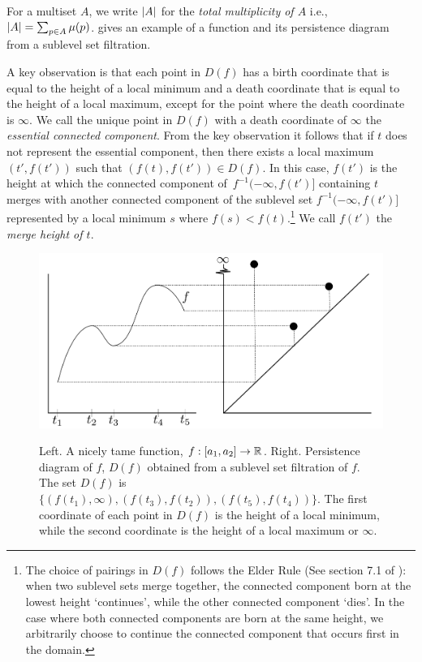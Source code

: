 For a multiset $A$, we write $\left|A\right|$
for the \emph{total multiplicity of $A$} i.e., $\left|A\right| = \sum_{p \in
A} \mu(p)$.  gives an example of a function and its persistence
diagram from a sublevel set filtration.

A key observation is that each point in $D(f)$ has a birth
coordinate that is equal to the height of a local minimum and a death coordinate
that is equal to the height of a local maximum, except for the point where the
death coordinate is $\infty$. 
We call the unique point in $D(f)$ with a death coordinate of $\infty$
the \emph{essential connected component}. From the key observation it follows that  if
$t$ does not represent the essential component, then there exists a local
maximum $(t', f(t'))$ such that $(f(t),f(t')) \in D(f)$.
In this case, $f(t')$ is the height at which the connected
component of~$f^{-1}(-\infty, f(t')]$ containing $t$ merges with another
connected component of the sublevel set $f^{-1}(-\infty, f(t')]$ represented by
a local minimum $s$ where $f(s) < f(t)$.\footnote{The choice of pairings in
$D(f)$ follows the Elder Rule (See section 7.1 of
\cite{EdelsbrunnerComputational10}): when two sublevel sets
merge together, the connected component born at the lowest height `continues',
while the other connected component `dies'. In the case where both connected
components are born at the same height, we arbitrarily choose to continue the
connected component that occurs first in the domain.} We call $f(t')$ the
\emph{merge height of $t$}.

\begin{figure}[htp]
    \centering
    {\includegraphics[width=.7\textwidth]{images/nodelife.pdf}} \\
    \caption{Left. A nicely tame function, $f:[a_1,a_2]\rightarrow \mathbb{R}$. Right. Persistence diagram of $f$, $D(f)$
	obtained from a sublevel set filtration of $f$.  The set
	$D(f)$ is $\{(f(t_1), \infty), (f(t_3), f(t_2)), (f(t_5), f(t_4))\}$. The first coordinate of each point in $D(f)$ is the height of a local minimum, while the second coordinate is the height of a local maximum or $\infty$.  }
    \label{fig:PD}
\end{figure}

